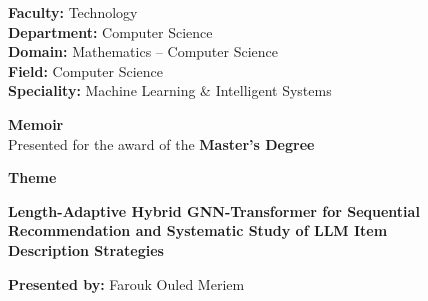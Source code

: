 \documentclass[12pt,a4paper]{report}
\begin{document}
\begin{titlepage}
  \begin{flushleft}
    {\small \textbf{Faculty:} Technology}\\[2pt]
    {\small \textbf{Department:} Computer Science}\\[2pt]
    {\small \textbf{Domain:} Mathematics -- Computer Science}\\[2pt]
    {\small \textbf{Field:} Computer Science}\\[2pt]
    {\small \textbf{Speciality:} Machine Learning \& Intelligent Systems}
  \end{flushleft}

  \vspace{0.5cm}

  \begin{center}
    {\large\bfseries Memoir}\\[4pt]
    {\normalsize Presented for the award of the \textbf{Master's Degree}}
  \end{center}

  \vspace{0.25cm}
  \begin{center}{\large\bfseries Theme}\end{center}
  \vspace{0.25cm}

  \begin{mdframed}[
    linecolor=black, linewidth=1pt,
    innertopmargin=14pt, innerbottommargin=14pt,
    innerleftmargin=18pt, innerrightmargin=18pt,
    roundcorner=4pt
  ]
    \begin{center}
      {\large\bfseries
        Length-Adaptive Hybrid GNN-Transformer for Sequential\\[5pt]
        Recommendation and Systematic Study of LLM Item\\[5pt]
        Description Strategies
      }
    \end{center}
  \end{mdframed}

  \vspace{0.55cm}

  \begin{center}
    \textbf{Presented by:} \quad Farouk Ouled Meriem
  \end{center}

  \vspace{0.35cm}


\end{titlepage}
\end{document}
